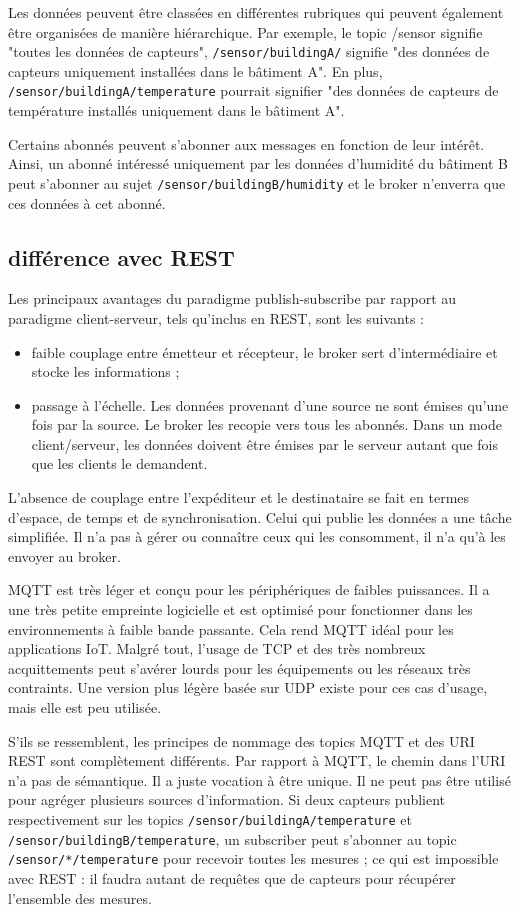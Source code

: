 Les données peuvent être classées en différentes rubriques qui peuvent également être organisées de manière hiérarchique. Par exemple, le topic /sensor signifie "toutes les données de capteurs", \texttt{/sensor/buildingA/} signifie "des données de capteurs uniquement installées dans le bâtiment A". En plus, \texttt{/sensor/buildingA/temperature} pourrait signifier "des données de capteurs de température installés uniquement dans le bâtiment A".

Certains abonnés peuvent s’abonner aux messages en fonction de leur intérêt. Ainsi, un abonné intéressé uniquement par les données d’humidité du bâtiment B peut s’abonner au sujet \texttt{/sensor/buildingB/humidity} et le broker n’enverra que ces données à cet abonné.

\subsection{différence avec REST}

Les principaux avantages du paradigme publish-subscribe par rapport au paradigme client-serveur, tels qu'inclus en REST, sont les suivants :
\begin{itemize}
\item faible couplage entre émetteur et récepteur, le broker sert d'intermédiaire et stocke les informations ;
\item passage à l’échelle. Les données provenant d'une source ne sont émises qu'une fois par la source. Le broker les recopie vers tous les abonnés. Dans un mode client/serveur, les données doivent être émises par le serveur autant que fois que les clients le demandent.
\end{itemize}
L’absence de couplage entre l’expéditeur et le destinataire se fait en termes d’espace, de temps et de synchronisation. Celui qui publie les données a une tâche simplifiée. Il n'a pas à gérer ou connaître ceux qui les consomment, il n'a qu’à les envoyer au broker.

MQTT est très léger et conçu pour les périphériques de faibles puissances. Il a une très petite empreinte logicielle et est optimisé pour fonctionner dans les environnements à faible bande passante. Cela rend MQTT idéal pour les applications IoT. Malgré tout, l’usage de TCP et des très nombreux acquittements peut s’avérer lourds pour les équipements ou les réseaux très contraints. Une version plus légère basée sur UDP existe pour ces cas d’usage, mais elle est peu utilisée.

S'ils se ressemblent, les principes de nommage des topics MQTT et des URI REST sont complètement différents. Par rapport à MQTT, le chemin dans l'URI n'a pas de sémantique. Il a juste vocation à être unique. Il ne peut pas être utilisé pour agréger plusieurs sources d'information. Si deux capteurs publient respectivement sur les topics \texttt{/sensor/buildingA/temperature} et \texttt{/sensor/buildingB/temperature}, un subscriber peut s'abonner au topic \texttt{/sensor/*/temperature} pour recevoir toutes les mesures ; ce qui est impossible avec REST : il faudra autant de requêtes que de capteurs pour récupérer l'ensemble des mesures.

